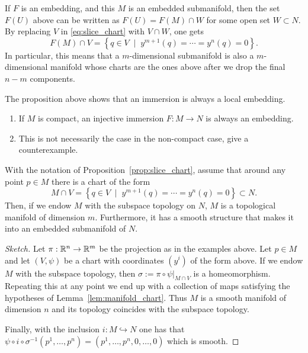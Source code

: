 If $F$ is an embedding, and this $M$ is an embedded submanifold, then the set $F(U)$ above can be written as $F(U) = F(M)\cap W$ for some open set $W\subset N$.
By replacing $V$ in \eqref{eq:slice_chart} with $V\cap W$, one gets 
\begin{equation}
  F(M)\cap V = \left\{ q \in V \;\mid\; y^{m+1}(q)=\cdots=y^n(q)=0\right\}.
\end{equation}
In particular, this means that a $m$-dimensional submanifold is also a $m$-dimensional manifold whose charts are the ones above after we drop the final $n-m$ components.

The proposition above shows that an immersion is always a local embedding.
\begin{exercise}
  \begin{enumerate}
    \item If $M$ is compact, an injective immersion $F:M\to N$ is always an embedding.
    \item This is not necessarily the case in the non-compact case, give a counterexample.
  \end{enumerate}
\end{exercise}

\begin{lemma}
  With the notation of Proposition~\ref{prop:slice_chart}, assume that around any point $p\in M$ there is a chart of the form
  \begin{equation}
    M\cap V = \left\{ q \in V \;\mid\; y^{m+1}(q)=\cdots=y^n(q)=0\right\} \subset N.
  \end{equation}
  Then, if we endow $M$ with the subspace topology on $N$, $M$ is a topological manifold of dimension $m$.
  Furthermore, it has a smooth structure that makes it into an embedded submanifold of $N$.
\end{lemma}
\begin{proof}[Sketch]
  Let $\pi: \mathbb{R}^n\to\mathbb{R}^m$ be the projection as in the examples above.
  Let $p\in M$ and let $(V,\psi)$ be a chart with coordinates $(y^i)$ of the form above.
  If we endow $M$ with the subspace topology, then $\sigma:= \pi \circ \psi\big|_{M\cap V}$ is a homeomorphism.
  Repeating this at any point we end up with a collection of maps satisfying the hypotheses of Lemma~\ref{lem:manifold_chart}.
  Thus $M$ is a smooth manifold of dimension $n$ and its topology coincides with the subspace topology.

  Finally, with the inclusion $i:M\hookrightarrow N$ one has that $\psi \circ i\circ \sigma^{-1} (p^1,\ldots,p^n) = (p^1,\ldots,p^n,0,\ldots,0)$ which is smooth.
\end{proof}


